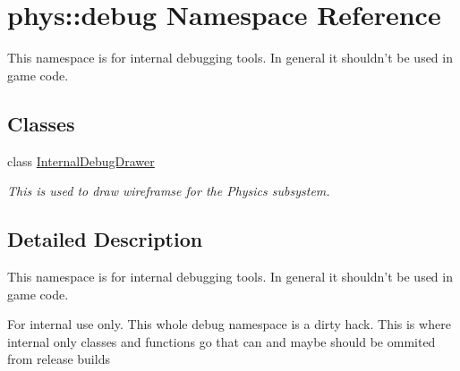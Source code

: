 \hypertarget{namespacephys_1_1debug}{
\section{phys::debug Namespace Reference}
\label{d0/d53/namespacephys_1_1debug}
}


This namespace is for internal debugging tools. In general it shouldn't be used in game code.  


\subsection*{Classes}
\begin{DoxyCompactItemize}
\item 
class \hyperlink{classphys_1_1debug_1_1InternalDebugDrawer}{InternalDebugDrawer}
\begin{DoxyCompactList}\small\item\em This is used to draw wireframse for the Physics subsystem. \item\end{DoxyCompactList}\end{DoxyCompactItemize}


\subsection{Detailed Description}
This namespace is for internal debugging tools. In general it shouldn't be used in game code. \begin{DoxyInternal}{For internal use only.}
This whole debug namespace is a dirty hack. This is where internal only classes and functions go that can and maybe should be ommited from release builds \end{DoxyInternal}

